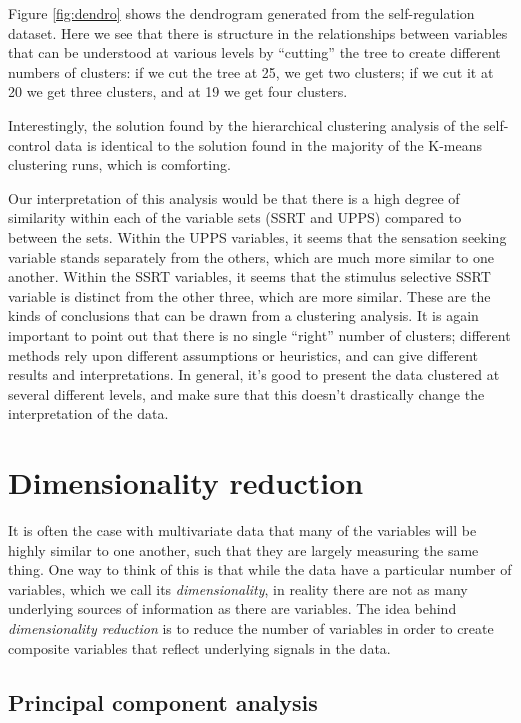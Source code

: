 \documentclass[
  12pt,
]{book}
\begin{document}
Figure \ref{fig:dendro} shows the dendrogram generated from the self-regulation dataset. Here we see that there is structure in the relationships between variables that can be understood at various levels by ``cutting'' the tree to create different numbers of clusters: if we cut the tree at 25, we get two clusters; if we cut it at 20 we get three clusters, and at 19 we get four clusters.

Interestingly, the solution found by the hierarchical clustering analysis of the self-control data is identical to the solution found in the majority of the K-means clustering runs, which is comforting.

Our interpretation of this analysis would be that there is a high degree of similarity within each of the variable sets (SSRT and UPPS) compared to between the sets. Within the UPPS variables, it seems that the sensation seeking variable stands separately from the others, which are much more similar to one another. Within the SSRT variables, it seems that the stimulus selective SSRT variable is distinct from the other three, which are more similar. These are the kinds of conclusions that can be drawn from a clustering analysis. It is again important to point out that there is no single ``right'' number of clusters; different methods rely upon different assumptions or heuristics, and can give different results and interpretations. In general, it's good to present the data clustered at several different levels, and make sure that this doesn't drastically change the interpretation of the data.

\hypertarget{dimensionality-reduction}{%
\section{Dimensionality reduction}\label{dimensionality-reduction}}

It is often the case with multivariate data that many of the variables will be highly similar to one another, such that they are largely measuring the same thing. One way to think of this is that while the data have a particular number of variables, which we call its \emph{dimensionality}, in reality there are not as many underlying sources of information as there are variables. The idea behind \emph{dimensionality reduction} is to reduce the number of variables in order to create composite variables that reflect underlying signals in the data.

\hypertarget{principal-component-analysis}{%
\subsection{Principal component analysis}\label{principal-component-analysis}}
\end{document}

